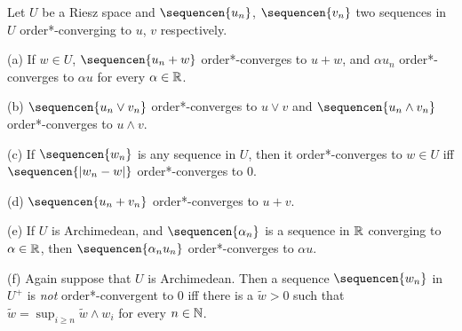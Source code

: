  Let $U$ be a Riesz space and
$\sequencen{u_n}$, $\sequencen{v_n}$ two sequences in $U$
order*-converging to $u$, $v$ respectively.
     
(a) If $w\in U$, $\sequencen{u_n+w}$
order*-converges to $u+w$, and $\alpha u_n$ order*-converges to
$\alpha u$ for every $\alpha\in\Bbb R$.
     
(b) $\sequencen{u_n\vee v_n}$ order*-converges to $u\vee v$
and $\sequencen{u_n\wedge v_n}$ order*-converges to $u\wedge v$.
     
(c) If $\sequencen{w_n}$ is any sequence in $U$, then it
order*-converges to $w\in U$ iff $\sequencen{|w_n-w|}$
order*-converges to $0$.
     
(d) $\sequencen{u_n+v_n}$ order*-converges to $u+v$.
     
(e) If $U$ is Archimedean, and $\sequencen{\alpha_n}$ is a sequence in
$\Bbb R$ converging to
$\alpha\in\Bbb R$, then $\sequencen{\alpha_nu_n}$
order*-converges to $\alpha u$.
     
(f) Again suppose that $U$ is Archimedean.   Then a sequence
$\sequencen{w_n}$ in $U^+$ is {\it not} order*-convergent to $0$ iff
there is a $\tilde w>0$ such that 
$\tilde w=\sup_{i\ge n}\tilde w\wedge w_i$ for every $n\in\Bbb N$.
     
